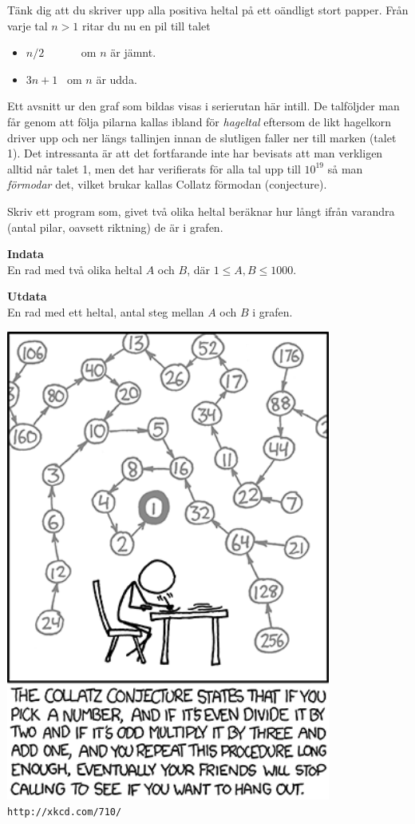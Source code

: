 
\begin{minipage}[t]{0.5\textwidth}
\vspace{0pt}
Tänk dig att du skriver upp alla positiva heltal på ett oändligt stort
papper. Från varje tal $n>1$ ritar du nu en pil till talet
\begin{itemize}
\item $n/2$ \ \ \ \ \ \ om $n$ är jämnt.
\item $3n+1$ \ om $n$ är udda.
\end{itemize}

Ett avsnitt ur den graf som bildas visas i serierutan här intill. De
talföljder man får genom att följa pilarna kallas ibland för {\em hageltal} eftersom de likt
hagelkorn driver upp och ner längs tallinjen innan de slutligen faller
ner till marken (talet 1). Det intressanta är att det fortfarande inte har bevisats att
man verkligen alltid når talet 1, men det har
verifierats för alla tal upp till $10^{19}$ så man {\em förmodar} det, vilket brukar kallas Collatz förmodan (conjecture).

Skriv ett program som, givet två olika heltal beräknar hur långt ifrån varandra (antal pilar,
oavsett riktning) de är i grafen.

{\bf \large Indata}\\
En rad med två olika heltal $A$ och $B$, där $1\leq A,B \leq 1000$.

{\bf \large Utdata}\\
En rad med ett heltal, antal steg mellan $A$ och $B$ i grafen.
\vfill
\end{minipage}
\begin{minipage}[t]{0.4\textwidth}
\vspace{0pt}
\begin{center}
\includegraphics[width=0.8\textwidth]{collatz.png} \\
\tt{http://xkcd.com/710/}
\end{center}


\end{minipage}

